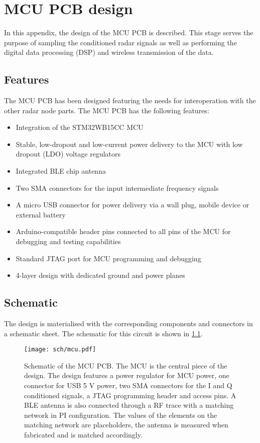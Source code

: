 \chapter{MCU PCB design} \label{app:mcu}

In this appendix, the design of the MCU PCB is described. This stage serves the purpose of sampling the conditioned radar signals as well as performing the digital data processing (DSP) and wireless transmission of the data.

\section{Features}

The MCU PCB has been designed featuring the needs for interoperation with the other radar node parts. The MCU PCB has the following features:
\begin{itemize}
	\item Integration of the STM32WB15CC \cite{STMicroelectronics2022} MCU
	\item Stable, low-dropout and low-current power delivery to the MCU with low dropout (LDO) voltage regulators
	\item Integrated BLE chip antenna
	\item Two SMA connectors for the input intermediate frequency signals
	\item A micro USB connector for power delivery via a wall plug, mobile device or external battery
	\item Arduino-compatible header pins connected to all pins of the MCU for debugging and testing capabilities
	\item Standard JTAG \cite{JTAG} port for MCU programming and debugging
	\item 4-layer design with dedicated ground and power planes
\end{itemize}

\section{Schematic}
The design is materialised with the corresponding components and connectors in a schematic sheet. The schematic for this circuit is shown in \cref{fig:sch_mcu}.

\begin{figure}[h]
	\centering
	\texttt{[image: sch/mcu.pdf]}
	\caption{Schematic of the MCU PCB. The MCU is the central piece of the design. The design features a power regulator for MCU power, one connector for USB 5 V power, two SMA connectors for the I and Q conditioned signals, a JTAG programming header and access pins. A BLE antenna is also connected through a RF trace with a matching network in PI configuration. The values of the elements on the matching network are placeholders, the antenna is measured when fabricated and is matched accordingly.}
	\label{fig:sch_mcu}
\end{figure}

